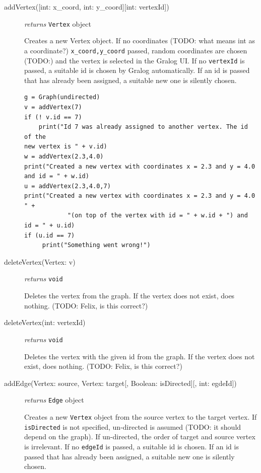 \documentclass{article}
\begin{document}
\begin{description}
\item[addVertex({[int: x\_coord, int: y\_coord]}{[int: vertexId]})]\emph{returns}
  \texttt{Vertex} object

  Creates a new Vertex object. If no coordinates (TODO: what means int
  as a coordinate?) \texttt{x\_coord,y\_coord} passed,
  random coordinates are chosen (TODO:) and the vertex is selected in
  the Gralog UI. If no \texttt{vertexId} is passed, a suitable id is
  chosen by Gralog automatically. If an id is passed that has already
  been assigned, a suitable new one is silently chosen.

  \begin{example}
\begin{verbatim}
g = Graph(undirected)
v = addVertex(7)
if (! v.id == 7)
    print("Id 7 was already assigned to another vertex. The id of the
new vertex is " + v.id)
w = addVertex(2.3,4.0)
print("Created a new vertex with coordinates x = 2.3 and y = 4.0 and id = " + w.id)
u = addVertex(2.3,4.0,7)
print("Created a new vertex with coordinates x = 2.3 and y = 4.0 " +
            "(on top of the vertex with id = " + w.id + ") and id = " + u.id)
if (u.id == 7)
     print("Something went wrong!")
\end{verbatim}
  \end{example}


  
\item[deleteVertex(Vertex: v)] \emph{returns} \texttt{void}

Deletes the vertex from the graph. If the vertex does not exist, does
nothing. (TODO: Felix, is this correct?)

\item[deleteVertex(int: vertexId)] \emph{returns} \texttt{void}

Deletes the vertex with the given id from the graph. If the vertex does not exist, does
nothing. (TODO: Felix, is this correct?)

\item[addEdge(Vertex: source, Vertex: target{[, Boolean: isDirected][,
    int: egdeId]})] \emph{returns} \texttt{Edge} object


Creates a new \texttt{Vertex} object from the source vertex to the
target vertex. If \texttt{isDirected} is not specified, un-directed is
assumed (TODO: it should depend on the graph). If un-directed, the
order of target and source vertex is irrelevant. If no \texttt{edgeId}
is passed, a suitable id is chosen. If an id is passed that has
already been assigned, a suitable new one is silently chosen.


\end{description}
\end{document}
